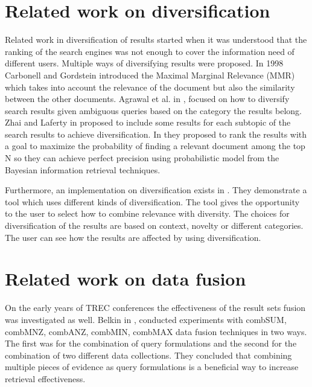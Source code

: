 \section{Related work on diversification}
Related work in diversification of results started when it was understood that the ranking of the search engines was not enough to cover the information need of different users. Multiple ways of diversifying results were proposed. In 1998 Carbonell and Gordstein \cite{CarbonellGoldstein} introduced the Maximal Marginal Relevance (MMR) which takes into account the relevance of the document but also the similarity between the other documents. Agrawal et al. in \cite{Agrawal}, focused on how to diversify search results given ambiguous queries based on the category the results belong. Zhai and Laferty in \cite{ZhaiLaferty06} proposed to include some results for each subtopic of the search results to achieve diversification. In \cite{ChenKarger} they proposed to rank the results with a goal to maximize the probability of finding a relevant document among the top N so they can achieve perfect precision using probabilistic model from the Bayesian information retrieval techniques.

Furthermore, an implementation on diversification exists in \cite{DrosouPitoura}. They demonstrate a tool which uses different kinds of diversification. The tool gives the opportunity to the user to select how to combine relevance with diversity. The choices for diversification of the results are based on context, novelty or different categories. The user can see how the results are affected by using diversification.


\section{Related work on data fusion}
On the early years of TREC conferences the effectiveness of the result sets fusion was investigated as well. Belkin in \cite{Belkin}, conducted experiments with combSUM, combMNZ, combANZ, combMIN, combMAX data fusion techniques in two ways. The first was for the combination of query formulations and the second for the combination of two different data collections. They concluded that combining multiple pieces of evidence as query formulations is a beneficial way to increase retrieval effectiveness.


